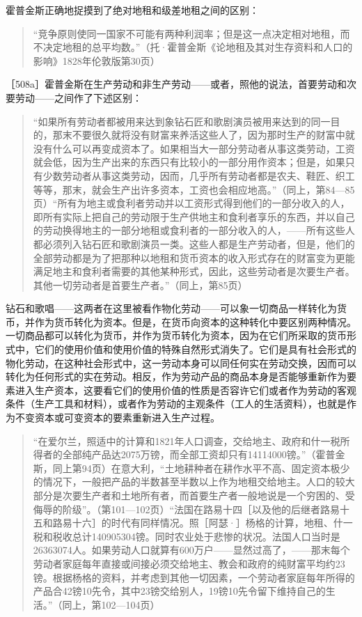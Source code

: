 霍普金斯正确地捉摸到了绝对地租和级差地租之间的区别：

\begin{quote}{“竞争原则使同一国家不可能有两种利润率；但是这一点决定相对地租，而不决定地租的总平均数。”（托·霍普金斯《论地租及其对生存资料和人口的影响》1828年伦敦版第30页）}\end{quote}

［508a］霍普金斯在生产劳动和非生产劳动——或者，照他的说法，首要劳动和次要劳动——之间作了下述区别：

\begin{quote}{“如果所有劳动者都被用来达到象钻石匠和歌剧演员被用来达到的同一目的，那末不要很久就将没有财富来养活这些人了，因为那时生产的财富中就没有什么可以再变成资本了。如果相当大一部分劳动者从事这类劳动，工资就会低，因为生产出来的东西只有比较小的一部分用作资本；但是，如果只有少数劳动者从事这类劳动，因而，几乎所有劳动者都是农夫、鞋匠、织工等等，那末，就会生产出许多资本，工资也会相应地高。”（同上，第84—85页）“所有为地主或食利者劳动并以工资形式得到他们的一部分收入的人，即所有实际上把自己的劳动限于生产供地主和食利者享乐的东西，并以自己的劳动换得地主的一部分地租或食利者的一部分收入的人，——所有这些人都必须列入钻石匠和歌剧演员一类。这些人都是生产劳动者，但是，他们的全部劳动都是为了把那种以地租和货币资本的收入形式存在的财富变为更能满足地主和食利者需要的其他某种形式，因此，这些劳动者是次要生产者。其他一切劳动者是首要生产者。”（同上，第85页）}\end{quote}

钻石和歌唱——这两者在这里被看作物化劳动——可以象一切商品一样转化为货币，并作为货币转化为资本。但是，在货币向资本的这种转化中要区别两种情况。一切商品都可以转化为货币，并作为货币转化为资本，因为在它们所采取的货币形式中，它们的使用价值和使用价值的特殊自然形式消失了。它们是具有社会形式的物化劳动，在这种社会形式中，这一劳动本身可以同任何实在劳动交换，因而可以转化为任何形式的实在劳动。相反，作为劳动产品的商品本身是否能够重新作为要素进入生产资本，这要看它们的使用价值的性质是否容许它们或者作为劳动的客观条件（生产工具和材料），或者作为劳动的主观条件（工人的生活资料），也就是作为不变资本或可变资本的要素重新进入生产过程。

\begin{quote}{“在爱尔兰，照适中的计算和1821年人口调查，交给地主、政府和什一税所得者的全部纯产品达2075万镑，而全部工资却只有14114000镑。”（霍普金斯，同上第94页）在意大利，“土地耕种者在耕作水平不高、固定资本极少的情况下，一般把产品的半数甚至半数以上作为地租交给地主。人口的较大部分是次要生产者和土地所有者，而首要生产者一般地说是一个穷困的、受侮辱的阶级”。（第101—102页）“法国在路易十四［以及他的后继者路易十五和路易十六］的时代有同样情况。照［阿瑟·］杨格的计算，地租、什一税和税收总计140905304镑。同时农业处于悲惨的状况。法国人口当时是26363074人。如果劳动人口就算有600万户——显然过高了，——那末每个劳动者家庭每年直接或间接必须交给地主、教会和政府的纯财富平均约23镑。根据杨格的资料，并考虑到其他一切因素，一个劳动者家庭每年所得的产品合42镑10先令，其中23镑交给别人，19镑10先令留下维持自己的生活。”（同上，第102—104页）}\end{quote}

